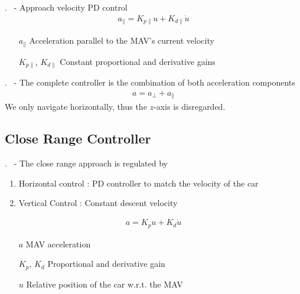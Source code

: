 
\begin{frame}{\thesection. \insertsection \ - \insertsubsection}
	Approach velocity PD control
	\begin{align}
		a_\parallel = K_{p\parallel} u + K_{d\parallel} \dot{u} 
	\end{align}
	\begin{enumerate}
		\item[$a_\parallel$] Acceleration parallel to the MAV's current velocity
		\item[$K_{p\parallel}$, $K_{d\parallel}$] Constant proportional and derivative gains
	\end{enumerate}
\end{frame}


\begin{frame}{\thesection. \insertsection \ - \insertsubsection}
	The complete controller is the combination of both acceleration components
	\begin{align}
		a = a_\perp + a_\parallel
	\end{align}
	We only navigate horizontally, thus the $z$-axis is disregarded.
\end{frame}


\subsection{Close Range Controller}
\begin{frame}{\thesection. \insertsection \ - \insertsubsection}
	The close range approach is regulated by
	\begin{enumerate}
		\item Horizontal control : PD controller to match the velocity of the car
		\item Vertical Control : Constant descent velocity
	\end{enumerate}

	\begin{align}
		a = K_p u + K_d \dot{u}
	\end{align}
	\begin{enumerate}
		\item[$a$] MAV acceleration
		\item[$K_p$, $K_d$] Proportional and derivative gain
		\item[$u$] Relative position of the car w.r.t. the MAV 
	\end{enumerate}
\end{frame}

